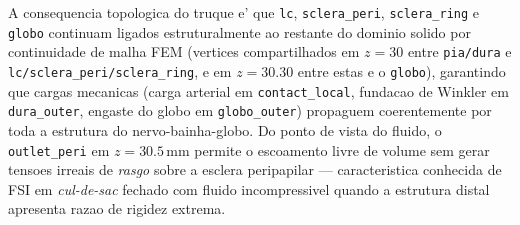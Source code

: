 A consequencia topologica do truque e' que \texttt{lc}, \texttt{sclera\_peri}, \texttt{sclera\_ring} e \texttt{globo} continuam ligados estruturalmente ao restante do dominio solido por continuidade de malha FEM (vertices compartilhados em $z = 30$ entre \texttt{pia/dura} e \texttt{lc/sclera\_peri/sclera\_ring}, e em $z = 30.30$ entre estas e o \texttt{globo}), garantindo que cargas mecanicas (carga arterial em \texttt{contact\_local}, fundacao de Winkler em \texttt{dura\_outer}, engaste do globo em \texttt{globo\_outer}) propaguem coerentemente por toda a estrutura do nervo-bainha-globo. Do ponto de vista do fluido, o \texttt{outlet\_peri} em $z = 30.5\,\si{\milli\meter}$ permite o escoamento livre de volume sem gerar tensoes irreais de \emph{rasgo} sobre a esclera peripapilar --- caracteristica conhecida de FSI em \emph{cul-de-sac} fechado com fluido incompressivel quando a estrutura distal apresenta razao de rigidez extrema.

